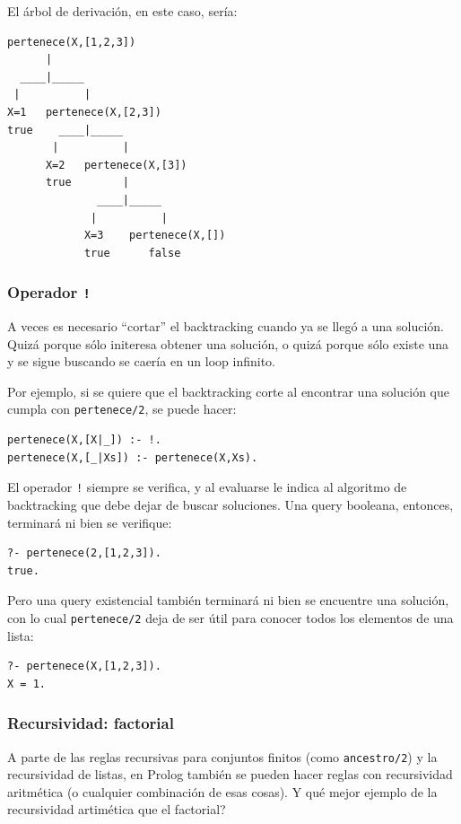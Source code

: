 \documentclass[12pt,titlepage]{article}
\begin{document}
El árbol de derivación, en este caso, sería:
\begin{Verbatim}[samepage=true,fontsize=\small]
pertenece(X,[1,2,3])
      |
  ____|_____      
 |          |
X=1   pertenece(X,[2,3])
true    ____|_____      
       |          |
      X=2   pertenece(X,[3])
      true        |
              ____|_____      
             |          |
            X=3    pertenece(X,[])
            true      false
\end{Verbatim}

\subsubsection{Operador \lstinline|!|}

A veces es necesario ``cortar'' el backtracking cuando ya se llegó a una solución. Quizá porque sólo initeresa obtener una solución, o quizá porque sólo existe una y se sigue buscando se caería en un loop infinito.

Por ejemplo, si se quiere que el backtracking corte al encontrar una solución que cumpla con \lstinline|pertenece/2|, se puede hacer:
\begin{lstlisting}
pertenece(X,[X|_]) :- !.
pertenece(X,[_|Xs]) :- pertenece(X,Xs).
\end{lstlisting}

El operador \lstinline|!| siempre se verifica, y al evaluarse le indica al algoritmo de backtracking que debe dejar de buscar soluciones. Una query booleana, entonces, terminará ni bien se verifique:
\begin{lstlisting}
?- pertenece(2,[1,2,3]).
true.
\end{lstlisting}

Pero una query existencial también terminará ni bien se encuentre una solución, con lo cual \lstinline|pertenece/2| deja de ser útil para conocer todos los elementos de una lista:
\begin{lstlisting}
?- pertenece(X,[1,2,3]).
X = 1.
\end{lstlisting}

\subsubsection{Recursividad: factorial}

A parte de las reglas recursivas para conjuntos finitos (como \lstinline|ancestro/2|) y la recursividad de listas, en Prolog también se pueden hacer reglas con recursividad aritmética (o cualquier combinación de esas cosas). Y qué mejor ejemplo de la recursividad artimética que el factorial?
\end{document}

